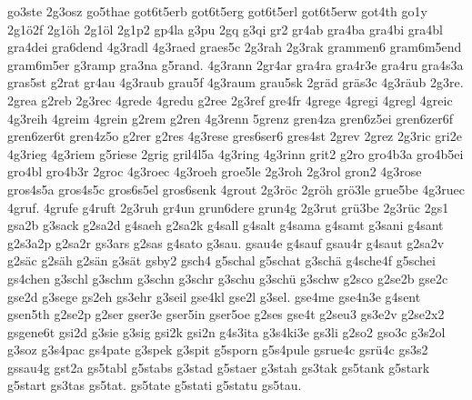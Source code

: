 {    go3ste
    2g3osz
    go5thae
    got6t5erb
    got6t5erg
    got6t5erl
    got6t5erw
    got4th
    go1y
    2g1ö2f
    2g1öh
    2g1öl
    2g1p2
    gp4la
    g3pu
    2gq
    g3qi
    gr2
    gr4ab
    gra4ba
    gra4bi
    gra4bl
    gra4dei
    gra6dend
    4g3radl
    4g3raed
    graes5c
    2g3rah
    2g3rak
    grammen6
    gram6m5end
    gram6m5er
    g3ramp
    gra3na
    g5rand.
    4g3rann
    2gr4ar
    gra4ra
    gra4r3e
    gra4ru
    gra4s3a
    gras5st
    g2rat
    gr4au
    4g3raub
    grau5f
    4g3raum
    grau5sk
    2gräd
    gräs3c
    4g3räub
    2g3re.
    2grea
    g2reb
    2g3rec
    4grede
    4gredu
    g2ree
    2g3ref
    gre4fr
    4grege
    4gregi
    4gregl
    4greic
    4g3reih
    4greim
    4grein
    g2rem
    g2ren
    4g3renn
    5grenz
    gren4za
    gren6z5ei
    gren6zer6f
    gren6zer6t
    gren4z5o
    g2rer
    g2res
    4g3rese
    gres6ser6
    gres4st
    2grev
    2grez
    2g3ric
    gri2e
    4g3rieg
    4g3riem
    g5riese
    2grig
    gril4l5a
    4g3ring
    4g3rinn
    grit2
    g2ro
    gro4b3a
    gro4b5ei
    gro4bl
    gro4b3r
    2groc
    4g3roec
    4g3roeh
    groe5le
    2g3roh
    2g3rol
    gron2
    4g3rose
    gros4s5a
    gros4s5c
    gros6s5el
    gros6senk
    4grout
    2g3röc
    2gröh
    grö3le
    grue5be
    4g3ruec
    4gruf.
    4grufe
    g4ruft
    2g3ruh
    gr4un
    grun6dere
    grun4g
    2g3rut
    grü3be
    2g3rüc
    2gs1
    gsa2b
    g3sack
    g2sa2d
    g4saeh
    g2sa2k
    g4sall
    g4salt
    g4sama
    g4samt
    g3sani
    g4sant
    g2s3a2p
    g2sa2r
    gs3ars
    g2sas
    g4sato
    g3sau.
    gsau4e
    g4sauf
    gsau4r
    g4saut
    g2sa2v
    g2säc
    g2säh
    g2sän
    g3sät
    gsby2
    gsch4
    g5schal
    g5schat
    g3schä
    g4sche4f
    g5schei
    gs4chen
    g3schl
    g3schm
    g3schn
    g3schr
    g3schu
    g3schü
    g3schw
    g2sco
    g2se2b
    gse2c
    gse2d
    g3sege
    gs2eh
    gs3ehr
    g3seil
    gse4kl
    gse2l
    g3sel.
    gse4me
    gse4n3e
    g4sent
    gsen5th
    g2se2p
    g2ser
    gser3e
    gser5in
    gser5oe
    g2ses
    gse4t
    g2seu3
    gs3e2v
    g2se2x2
    gsgene6t
    gsi2d
    g3sie
    g3sig
    gsi2k
    gsi2n
    g4s3ita
    g3s4ki3e
    gs3li
    g2so2
    gso3c
    g3s2ol
    g3soz
    g3s4pac
    gs4pate
    g3spek
    g3spit
    g5sporn
    g5s4pule
    gsrue4c
    gsrü4c
    gs3s2
    gssau4g
    gst2a
    gs5tabl
    g5stabs
    g3stad
    g5staer
    g3stah
    gs3tak
    gs5tank
    g5stark
    g5start
    gs3tas
    gs5tat.
    gs5tate
    g5stati
    g5statu
    gs5tau.
}

